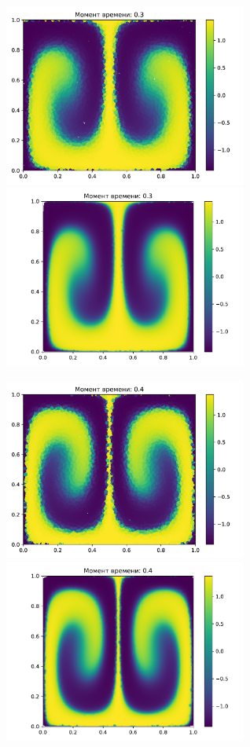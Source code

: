     \begin{figure}[H]
        \centering
        \includegraphics[width=8cm]{pictures/s15.png}
        \includegraphics[width=8cm]{pictures/p15.pdf}
    \end{figure}
    \begin{figure}[H]
        \centering
        \includegraphics[width=8cm]{pictures/s20.png}
        \includegraphics[width=8cm]{pictures/p20.pdf}
    \end{figure}


